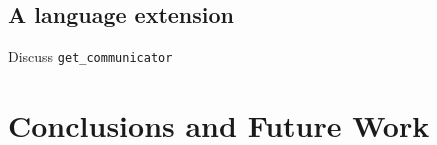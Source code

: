 \subsection{A language extension}
Discuss \lstinline|get_communicator|

\section{Conclusions and Future Work}\label{sec:conclusions}







